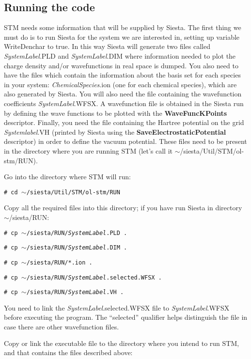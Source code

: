 \subsection{Running the code}

 {\sc STM} needs some information that will be supplied by {\sc Siesta}. 
 The first thing we must do is to run {\sc Siesta} for 
 the system we are interested in,
 setting up variable WriteDenchar to true. 
 In this way {\sc Siesta} will generate
 two files called {\it SystemLabel}.PLD and {\it SystemLabel}.DIM
 where information 
 needed to plot the charge density and/or wavefunctions 
 in real space is dumped. You also need to have the files which
 contain the information about the basis set for each species
 in your system: {\it ChemicalSpecies}.ion (one for each
 chemical species), which
 are also generated by  {\sc Siesta}.
 You will also need the file containing the
 wavefunction coefficients {\it SystemLabel}.WFSX. 
 A wavefunction file is obtained
 in the {\sc Siesta} run by defining the wave functions to be
 plotted with the {\bf WaveFuncKPoints} descriptor.
 Finally, you need the file containing the Hartree potential on the grid 
 {\it Systemlabel}.VH (printed by {\sc Siesta} using the 
 {\bf SaveElectrostaticPotential} descriptor)
 in order to define the vacuum potential. 
 These files need to be present in the
 directory where you are running {\sc STM} (let's call it
 $\sim$/siesta/Util/STM/ol-stm/RUN).

 Go into the directory where {\sc STM} will run:

 {\tt \# cd $\sim$/siesta/Util/STM/ol-stm/RUN}

 Copy all the required files into this directory; if you
 have run {\sc Siesta} in directory $\sim$/siesta/RUN:

 {\tt \# cp $\sim$/siesta/RUN/{\it SystemLabel}.PLD .}

 {\tt \# cp $\sim$/siesta/RUN/{\it SystemLabel}.DIM .}

 {\tt \# cp $\sim$/siesta/RUN/*.ion .}

 {\tt \# cp $\sim$/siesta/RUN/{\it SystemLabel}.selected.WFSX .}

 {\tt \# cp $\sim$/siesta/RUN/{\it SystemLabel}.VH .}

 You need to link the {\it SystemLabel}.selected.WFSX file to {\it
     SystemLabel}.WFSX before executing the program. The ``selected''
     qualifier helps distinguish the file in case there are other
     wavefunction files.
     
 Copy or link the executable file to the directory
 where you intend to run  {\sc STM}, and that
 contains the files described above:

